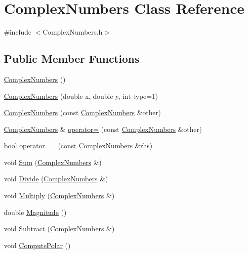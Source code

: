 \hypertarget{class_complex_numbers}{\section{Complex\-Numbers Class Reference}
\label{class_complex_numbers}
}


{\ttfamily \#include $<$Complex\-Numbers.\-h$>$}

\subsection*{Public Member Functions}
\begin{DoxyCompactItemize}
\item 
\hyperlink{class_complex_numbers_abe7f2d867272b9f2081450eb840eb392}{Complex\-Numbers} ()
\item 
\hyperlink{class_complex_numbers_a54483a46b7000f03c0d42fb14119727c}{Complex\-Numbers} (double x, double y, int type=1)
\item 
\hyperlink{class_complex_numbers_a65a69574d83b3606ecc2e5577b87db25}{Complex\-Numbers} (const \hyperlink{class_complex_numbers}{Complex\-Numbers} \&other)
\item 
\hyperlink{class_complex_numbers}{Complex\-Numbers} \& \hyperlink{class_complex_numbers_a8ffc65beb804040401bf11d2726e1e0b}{operator=} (const \hyperlink{class_complex_numbers}{Complex\-Numbers} \&other)
\item 
bool \hyperlink{class_complex_numbers_a7bb3e8e24b86f9546f6db5c1613793d7}{operator==} (const \hyperlink{class_complex_numbers}{Complex\-Numbers} \&rhs)
\item 
void \hyperlink{class_complex_numbers_a460557b8149ac7e5e31fcc50bf42cdec}{Sum} (\hyperlink{class_complex_numbers}{Complex\-Numbers} \&)
\item 
void \hyperlink{class_complex_numbers_afa1a23565f5d3e475049f95ee0d61650}{Divide} (\hyperlink{class_complex_numbers}{Complex\-Numbers} \&)
\item 
void \hyperlink{class_complex_numbers_a18fbc37a7e3876d4b6eb4290f40a2358}{Multiply} (\hyperlink{class_complex_numbers}{Complex\-Numbers} \&)
\item 
double \hyperlink{class_complex_numbers_a6c19294ed456b1ed135e2e08c8aa0fdc}{Magnitude} ()
\item 
void \hyperlink{class_complex_numbers_a531304f986e73fd486c6f4df9f5c0920}{Subtract} (\hyperlink{class_complex_numbers}{Complex\-Numbers} \&)
\item 
void \hyperlink{class_complex_numbers_a2056e2c3a7ef79765c58b14d4b17f9cf}{Compute\-Polar} ()

\end{DoxyCompactItemize}
